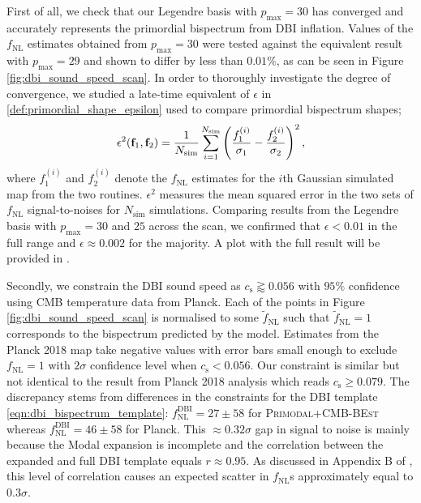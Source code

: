 First of all, we check that our Legendre basis with $p_\text{max}=30$ has converged and accurately represents the primordial bispectrum from DBI inflation. Values of the $f_\text{NL}$ estimates obtained from $p_\text{max}=30$ were tested against the equivalent result with $p_\text{max}=29$ and shown to differ by less than $0.01\%$, as can be seen in Figure \ref{fig:dbi_sound_speed_scan}. In order to thoroughly investigate the degree of convergence, we studied a late-time equivalent of $\epsilon$ in  \eqref{def:primordial_shape_epsilon} used to compare primordial bispectrum shapes;
\begin{align}
	\epsilon^2 (\mathbf{f}_1, \mathbf{f}_2) = \frac{1}{N_\text{sim}}  \sum_{i=1}^{N_\text{sim}} \left( \frac{f^{(i)}_1}{\sigma_1} - \frac{f^{(i)}_2}{\sigma_2} \right)^2,
\end{align}
where $f^{(i)}_1$ and $f^{(i)}_2$ denote the $f_\text{NL}$ estimates for the $i$th Gaussian simulated map from the two routines. $\epsilon^2$ measures the mean squared error in the two sets of $f_\text{NL}$ signal-to-noises for $N_\text{sim}$ simulations. Comparing results from the Legendre basis with $p_\text{max} = 30$ and $25$ across the scan, we confirmed that $\epsilon < 0.01$ in the full range and $\epsilon \approx 0.002$ for the majority. A plot with the full result will be provided in \cite{Sohn2021inprep}.

Secondly, we constrain the DBI sound speed as $c_\text{s} \gtrapprox 0.056$ with $95\%$ confidence using CMB temperature data from Planck. Each of the points in Figure \ref{fig:dbi_sound_speed_scan} is normalised to some $\tilde{f}_\text{NL}$ such that $\tilde{f}_\text{NL}=1$ corresponds to the bispectrum predicted by the model. Estimates from the Planck 2018 map take negative values with error bars small enough to exclude $f_\text{NL}=1$ with $2\sigma$ confidence level when $c_\text{s} < 0.056$. Our constraint is similar but not identical to the result from Planck 2018 analysis which reads $c_\text{s} \ge 0.079$. The discrepancy stems from differences in the constraints for the DBI template \eqref{eqn:dbi_bispectrum_template}: $f^\text{DBI}_\text{NL}=27 \pm 58$ for \textsc{Primodal}+\textsc{CMB-BEst} whereas $f^\text{DBI}_\text{NL}=46 \pm 58$ for Planck. This $\approx0.32\sigma$ gap in signal to noise is mainly because the Modal expansion is incomplete and the correlation between the expanded and full DBI template equals $r\approx 0.95$. As discussed in Appendix B of \cite{PlanckCollaboration2013}, this level of correlation causes an expected scatter in $f_\text{NL}$s approximately equal to $0.3\sigma$.

